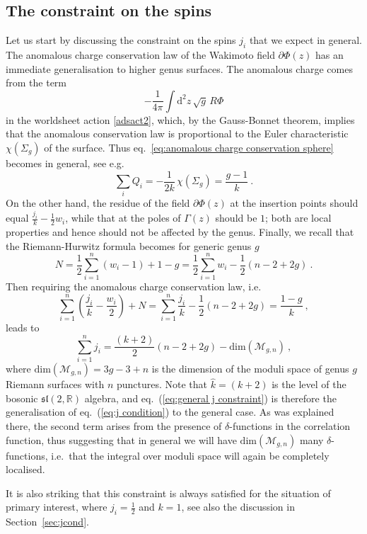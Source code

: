 \documentclass[12pt,a4paper]{article}
\newcommand{\be}{\begin{equation}}
\newcommand{\ee}{\end{equation}}
\begin{document}
\subsection{The constraint on the spins}
Let us start by discussing the constraint on the spins $j_i$ that we expect in general. The anomalous charge conservation law of the Wakimoto field $\partial \Phi(z)$ has an immediate generalisation to higher genus surfaces. The anomalous charge comes from the term 
\be 
-\frac{1}{4\pi}\int \mathrm{d}^2 z \, \sqrt{g}\,R \Phi
\ee
in the worldsheet action \eqref{adsact2}, which, by the Gauss-Bonnet theorem, implies that the anomalous conservation  law is proportional to the Euler characteristic $\chi(\Sigma_g)$ of the surface. Thus eq.~\eqref{eq:anomalous charge conservation sphere} becomes in general, see e.g.~\cite[Section 9.1.3]{DiFrancesco:1997nk}
\be 
\sum_i Q_i =-\frac{1}{2k} \, \chi (\Sigma_g)=\frac{g-1}{k}\ .
\ee
On the other hand, the residue of the field $\partial \Phi(z)$ at the insertion points should equal $\frac{j_i}{k}-\tfrac{1}{2}w_i$, while that at the poles of $\Gamma(z)$ should be $1$; both are local properties and hence should not be affected by the genus. Finally, we recall that the Riemann-Hurwitz formula becomes for generic genus $g$ 
\be 
N=\frac{1}{2} \sum_{i=1}^n (w_i-1)+1-g  = \frac{1}{2} \sum_{i=1}^{n} w_i - \frac{1}{2} (n-2+2g)\ . \label{eq:Riemann Hurwitz formula}
\ee
Then requiring the anomalous charge conservation law, i.e. 
\be
\sum_{i=1}^n \left( \frac{j_i}{k} - \frac{w_i}{2} \right) + N = \sum_{i=1}^n \frac{j_i}{k} - \frac{1}{2} (n-2+2g) = \frac{1-g}{k} \ , 
\ee 
leads to 
\be 
\sum_{i=1}^n j_i=\frac{(k+2)}{2}(n-2+2g)-\text{dim}(\mathcal{M}_{g,n})\ , \label{eq:general j constraint}
\ee
where $\text{dim}(\mathcal{M}_{g,n})=3g-3+n$ is the dimension of the moduli space of genus $g$ Riemann surfaces with $n$ punctures. Note that $\hat{k}=(k+2)$ is the level of the bosonic $\mathfrak{sl}(2,\mathds{R})$ algebra, and eq.~(\ref{eq:general j constraint}) is therefore the generalisation of eq.~(\ref{eq:j condition}) to the general case. As was explained there, the second term arises from the presence of $\delta$-functions in the correlation function, thus suggesting that in general we will have $\text{dim}(\mathcal{M}_{g,n})$ many $\delta$-functions, i.e.\ that the integral over moduli space will again be completely localised.

It is also striking that this constraint is always satisfied for the situation of primary interest, where $j_i=\tfrac{1}{2}$ and $k=1$,  see also the discussion in Section~\ref{sec:jcond}.
\end{document}
